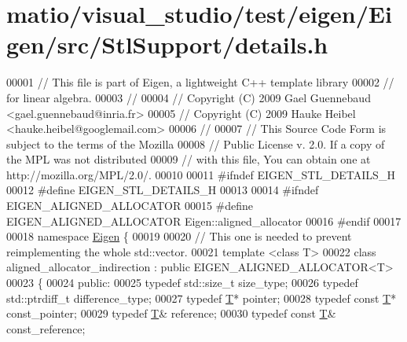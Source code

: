 \hypertarget{matio_2visual__studio_2test_2eigen_2_eigen_2src_2_stl_support_2details_8h_source}{}\section{matio/visual\+\_\+studio/test/eigen/\+Eigen/src/\+Stl\+Support/details.h}
\label{matio_2visual__studio_2test_2eigen_2_eigen_2src_2_stl_support_2details_8h_source}

\begin{DoxyCode}
00001 \textcolor{comment}{// This file is part of Eigen, a lightweight C++ template library}
00002 \textcolor{comment}{// for linear algebra.}
00003 \textcolor{comment}{//}
00004 \textcolor{comment}{// Copyright (C) 2009 Gael Guennebaud <gael.guennebaud@inria.fr>}
00005 \textcolor{comment}{// Copyright (C) 2009 Hauke Heibel <hauke.heibel@googlemail.com>}
00006 \textcolor{comment}{//}
00007 \textcolor{comment}{// This Source Code Form is subject to the terms of the Mozilla}
00008 \textcolor{comment}{// Public License v. 2.0. If a copy of the MPL was not distributed}
00009 \textcolor{comment}{// with this file, You can obtain one at http://mozilla.org/MPL/2.0/.}
00010 
00011 \textcolor{preprocessor}{#ifndef EIGEN\_STL\_DETAILS\_H}
00012 \textcolor{preprocessor}{#define EIGEN\_STL\_DETAILS\_H}
00013 
00014 \textcolor{preprocessor}{#ifndef EIGEN\_ALIGNED\_ALLOCATOR}
00015 \textcolor{preprocessor}{  #define EIGEN\_ALIGNED\_ALLOCATOR Eigen::aligned\_allocator}
00016 \textcolor{preprocessor}{#endif}
00017 
00018 \textcolor{keyword}{namespace }\hyperlink{namespace_eigen}{Eigen} \{
00019 
00020   \textcolor{comment}{// This one is needed to prevent reimplementing the whole std::vector.}
00021   \textcolor{keyword}{template} <\textcolor{keyword}{class} T>
00022   \textcolor{keyword}{class }aligned\_allocator\_indirection : \textcolor{keyword}{public} EIGEN\_ALIGNED\_ALLOCATOR<T>
00023   \{
00024   \textcolor{keyword}{public}:
00025     \textcolor{keyword}{typedef} std::size\_t     size\_type;
00026     \textcolor{keyword}{typedef} std::ptrdiff\_t  difference\_type;
00027     \textcolor{keyword}{typedef} \hyperlink{group___sparse_core___module_class_eigen_1_1_triplet}{T}*              pointer;
00028     \textcolor{keyword}{typedef} \textcolor{keyword}{const} \hyperlink{group___sparse_core___module_class_eigen_1_1_triplet}{T}*        const\_pointer;
00029     \textcolor{keyword}{typedef} \hyperlink{group___sparse_core___module_class_eigen_1_1_triplet}{T}&              reference;
00030     \textcolor{keyword}{typedef} \textcolor{keyword}{const} \hyperlink{group___sparse_core___module_class_eigen_1_1_triplet}{T}&        const\_reference;

\end{DoxyCode}

